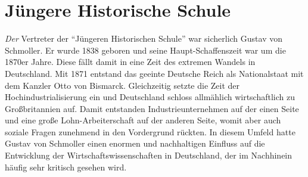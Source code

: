 \section{Jüngere Historische Schule}

\textit{Der} Vertreter der "`Jüngeren Historischen Schule"' war sicherlich Gustav von Schmoller. Er wurde 1838 geboren und seine Haupt-Schaffenszeit war um die 1870er Jahre. Diese fällt damit in eine Zeit des extremen Wandels in Deutschland. Mit 1871 entstand das geeinte Deutsche Reich als Nationalstaat mit dem Kanzler Otto von Bismarck. Gleichzeitig setzte die Zeit der Hochindustrialisierung ein und Deutschland schloss allmählich wirtschaftlich zu Großbritannien auf. Damit entstanden Industrieunternehmen auf der einen Seite und eine große Lohn-Arbeiterschaft auf der anderen Seite, womit aber auch soziale Fragen zunehmend in den Vordergrund rückten. In diesem Umfeld hatte Gustav von Schmoller einen enormen und nachhaltigen Einfluss auf die Entwicklung der Wirtschaftswissenschaften in Deutschland, der im Nachhinein häufig sehr kritisch gesehen wird. 

